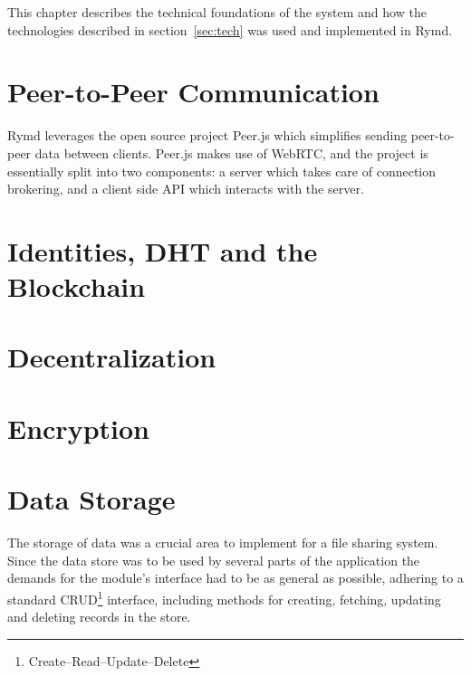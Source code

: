 This chapter describes the technical foundations of the system and  how the technologies described in section~\ref{sec:tech} was used and implemented in Rymd.

\section{Peer-to-Peer Communication}
\label{sec:p2p}


Rymd leverages the open source project Peer.js which simplifies sending peer-to-peer data between clients. Peer.js makes use of WebRTC, and the project is essentially split into two components: a server which takes care of connection brokering, and a client side API which interacts with the server.


\section{Identities, DHT and the Blockchain}
\label{sec:authorization}


\section{Decentralization}



\section{Encryption}
\label{sec:cryptography}


\section{Data Storage}
\label{sec:datastorage}
The storage of data was a crucial area to implement for a file sharing system. Since the data store was to be used by several parts of the application the demands for the module's interface had to be as general as possible, adhering to a standard CRUD\footnote{Create–Read–Update–Delete} interface, including methods for creating, fetching, updating and deleting records in the store.

